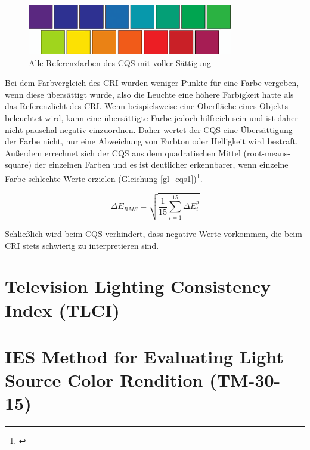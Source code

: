 \begin{figure}[htp]     %
\centering
\includegraphics[width=0.8\textwidth]{bilder/cqs} 
\caption {Alle Referenzfarben des CQS mit voller Sättigung\protect\footnotemark}\label{b_cri}
\end{figure}

Bei dem Farbvergleich des CRI wurden weniger Punkte für eine Farbe vergeben, wenn diese übersättigt wurde, also die Leuchte eine höhere Farbigkeit hatte als das Referenzlicht des CRI. Wenn beispielsweise eine Oberfläche eines Objekts beleuchtet wird, kann eine übersättigte Farbe jedoch hilfreich sein und ist daher nicht pauschal negativ einzuordnen. Daher wertet der CQS eine Übersättigung der Farbe nicht, nur eine Abweichung von Farbton oder Helligkeit wird bestraft. Außerdem errechnet sich der CQS aus dem quadratischen Mittel (root-means-square) der einzelnen Farben und es ist deutlicher erkennbarer, wenn einzelne Farbe schlechte Werte erzielen (Gleichung \ref{gl_cqs1})\footnote{\cite{davis_ohno}}.

\begin{equation}\label{gl_cqs1}
		\Delta E_{RMS} = \sqrt{\frac{1}{15} \sum_{i=1}^{15} \Delta E_{i} ^{2}} 
\end{equation}

Schließlich wird beim CQS verhindert, dass negative Werte vorkommen, die beim CRI stets schwierig zu interpretieren sind. 



\section{Television Lighting Consistency Index (TLCI)} \label{sec_tlci}



\section{IES Method for Evaluating Light Source Color Rendition (TM-30-15)} \label{sec_tm30}

